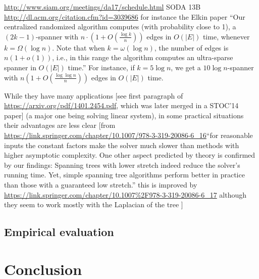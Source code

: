 \documentclass[nobib, a4paper, 10pt, oneside, onecolumn, openany, notitlepage, final,
svgnames, marginals=raggedouter, english,
]{article}
\begin{document}
% 

\url{http://www.siam.org/meetings/da17/schedule.html} SODA 13B \url{http://dl.acm.org/citation.cfm?id=3039686}
for instance the Elkin paper \enquote{Our centralized randomized algorithm computes (with
probability close to 1), a $(2k - 1)$-spanner with $n \cdot (1 + O(\frac{\log k}{n}))$ edges in
$O(|E|)$ time, whenever $k = \Omega(\log n)$. Note that when $k = \omega(\log n)$, the number of
edges is $n(1+o(1))$, i.e., in this range the algorithm computes an ultra-sparse spanner in $O(|E|)$
time.} For instance, if $k=5\log n$, we get a $10\log n$-spanner with $n\left(1+O\left(\frac{\log\log
n}{n}\right)\right)$ edges in $O(|E|)$ time.

While they have many applications [see first paragraph of \url{https://arxiv.org/pdf/1401.2454.pdf},
which was later merged in a STOC'14 paper] (a major one being solving linear system), in some
practical situations their advantages are less clear [from
\url{https://link.springer.com/chapter/10.1007/978-3-319-20086-6_16}\enquote{for reasonable inputs
the constant factors make the solver much slower than methods with higher asymptotic complexity.
One other aspect predicted by theory is confirmed by our findings: Spanning trees with lower
stretch indeed reduce the solver's running time. Yet, simple spanning tree algorithms perform
better in practice than those with a guaranteed low stretch.} this is improved by
\url{https://link.springer.com/chapter/10.1007%2F978-3-319-20086-6_17} although they seem to work
	mostly with the Laplacian of the tree ]
\fi

\subsection{Empirical evaluation}
\label{sub:gtx_empirical_evaluation}

% 

\section{Conclusion}


\begingroup
{}
\todos

\setlength\bibitemsep{2pt}
\printbibliography
\restoregeometry
\endgroup

% 
% 
\end{document}
